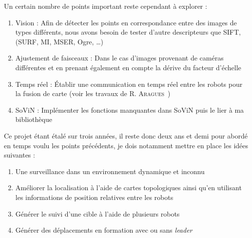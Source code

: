 Un certain nombre de points important reste cependant à explorer :
\begin{enumerate}
\item Vision : Afin de détecter les points en correspondance entre des images de types différents, nous avons besoin de tester d'autre descripteurs que SIFT, (SURF, MI, MSER, Ogre, \dots)
\item Ajustement de faisceaux : Dans le cas d'images provenant de caméras différentes et en prenant également en compte la dérive du facteur d'échelle
\item Temps réel : Établir une communication en temps réel entre les robots pour la fusion de carte (voir les travaux de R. \textsc{Aragues}~\cite{Aragues11PhD})
\item SoViN : Implémenter les fonctions manquantes dans SoViN puis le lier à ma bibliothèque 
\end{enumerate}

Ce projet étant étalé sur trois années, il reste donc deux ans et demi pour abordé en temps voulu les points précédents, je dois notamment mettre en place les idées suivantes :
\begin{enumerate}
\item Une surveillance dans un environnement dynamique et inconnu
\item Améliorer la localisation à l'aide de cartes topologiques ainsi qu'en utilisant les informations de position relatives entre les robots
\item Générer le suivi d'une cible à l'aide de plusieurs robots
\item Générer des déplacements en formation avec ou sans \emph{leader}
\end{enumerate}

